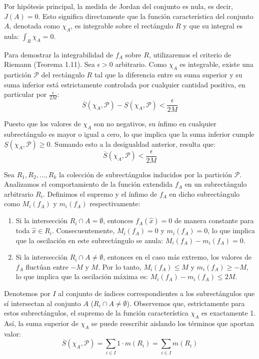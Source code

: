 \documentclass[11pt,letterpaper]{article}
\begin{document}
Por hipótesis principal, la medida de Jordan del conjunto es nula, es decir, $J(A) = 0$. Esto significa directamente que la función característica del conjunto $A$, denotada como $\chi_A$, es integrable sobre el rectángulo $R$ y que su integral es nula: $\int_R \chi_A = 0$.

Para demostrar la integrabilidad de $f_A$ sobre $R$, utilizaremos el criterio de Riemann (Teorema 1.11). Sea $\epsilon > 0$ arbitrario. Como $\chi_A$ es integrable, existe una partición $\mathcal{P}$ del rectángulo $R$ tal que la diferencia entre su suma superior y su suma inferior está estrictamente controlada por cualquier cantidad positiva, en particular por $\frac{\epsilon}{2M}$:
\begin{equation*}
\overline{S}(\chi_A, \mathcal{P}) - \underline{S}(\chi_A, \mathcal{P}) < \frac{\epsilon}{2M}
\end{equation*}

Puesto que los valores de $\chi_A$ son no negativos, su ínfimo en cualquier subrectángulo es mayor o igual a cero, lo que implica que la suma inferior cumple $\underline{S}(\chi_A, \mathcal{P}) \ge 0$. Sumando esto a la desigualdad anterior, resulta que:
\begin{equation*}
\overline{S}(\chi_A, \mathcal{P}) < \frac{\epsilon}{2M}
\end{equation*}

Sea $R_1, R_2, \dots, R_k$ la colección de subrectángulos inducidos por la partición $\mathcal{P}$. Analizamos el comportamiento de la función extendida $f_A$ en un subrectángulo arbitrario $R_i$. Definimos el supremo y el ínfimo de $f_A$ en dicho subrectángulo como $M_i(f_A)$ y $m_i(f_A)$ respectivamente:
\begin{enumerate}
    \item Si la intersección $R_i \cap A = \emptyset$, entonces $f_A(\hat{x}) = 0$ de manera constante para toda $\hat{x} \in R_i$. Consecuentemente, $M_i(f_A) = 0$ y $m_i(f_A) = 0$, lo que implica que la oscilación en este subrectángulo se anula: $M_i(f_A) - m_i(f_A) = 0$.
    \item Si la intersección $R_i \cap A \neq \emptyset$, entonces en el caso más extremo, los valores de $f_A$ fluctúan entre $-M$ y $M$. Por lo tanto, $M_i(f_A) \le M$ y $m_i(f_A) \ge -M$, lo que implica que la oscilación máxima es: $M_i(f_A) - m_i(f_A) \le 2M$.
\end{enumerate}

Denotemos por $I$ al conjunto de índices correspondientes a los subrectángulos que sí intersectan al conjunto $A$ ($R_i \cap A \neq \emptyset$). Observemos que, estrictamente para estos subrectángulos, el supremo de la función característica $\chi_A$ es exactamente 1. Así, la suma superior de $\chi_A$ se puede reescribir aislando los términos que aportan valor:
\begin{equation*}
\overline{S}(\chi_A, \mathcal{P}) = \sum_{i \in I} 1 \cdot m(R_i) = \sum_{i \in I} m(R_i)
\end{equation*}
\end{document}
